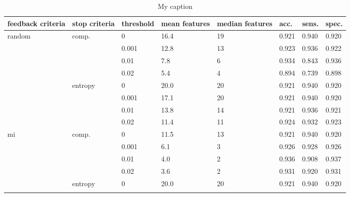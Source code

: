 \begin{table}[]
	\centering
	\caption{My caption}
	\label{my-label}
	\begin{tabularx}{\textwidth}{|X|X|X|X|X|X|X|X|}
		\hline
		feedback criteria  & stop criteria & threshold & mean features & median features & acc. & sens. & spec. \\ \toprule
		\multirow{8}{*}{random} & \multirow{4}{*}{comp.} & 0         & 16.4                   & 19                       & 0.921    & 0.940       & 0.920       \\ \cline{3-8}
		&               & 0.001     & 12.8                   & 13                       & 0.923    & 0.936       & 0.922       \\ \cline{3-8}
		&               & 0.01      & 7.8                    & 6                        & 0.934    & 0.843       & 0.936       \\ \cline{3-8}
		&               & 0.02      & 5.4                    & 4                        & 0.894    & 0.739       & 0.898       \\ \cline{2-8}
		& \multirow{4}{*}{entropy} & 0         & 20.0                   & 20                       & 0.921    & 0.940       & 0.920       \\ \cline{3-8}
		&               & 0.001     & 17.1                   & 20                       & 0.921    & 0.940       & 0.920       \\ \cline{3-8}
		&               & 0.01      & 13.8                   & 14                       & 0.921    & 0.936       & 0.921       \\ \cline{3-8}
		&               & 0.02      & 11.4                   & 11                       & 0.924    & 0.932       & 0.923       \\ \hline
		\multirow{8}{*}{mi} & \multirow{4}{*}{comp.}    & 0         & 11.5                   & 13                       & 0.921    & 0.940       & 0.920       \\ \cline{3-8}
		&               & 0.001     & 6.1                    & 3                        & 0.926    & 0.928       & 0.926       \\ \cline{3-8}
		&               & 0.01      & 4.0                    & 2                        & 0.936    & 0.908       & 0.937       \\ \cline{3-8}
		&               & 0.02      & 3.6                    & 2                        & 0.931    & 0.920       & 0.931       \\ \cline{2-8}
		& \multirow{4}{*}{entropy} & 0         & 20.0                   & 20                       & 0.921    & 0.940       & 0.920       \\ \cline{3-8}

\end{tabularx}
\end{table}
